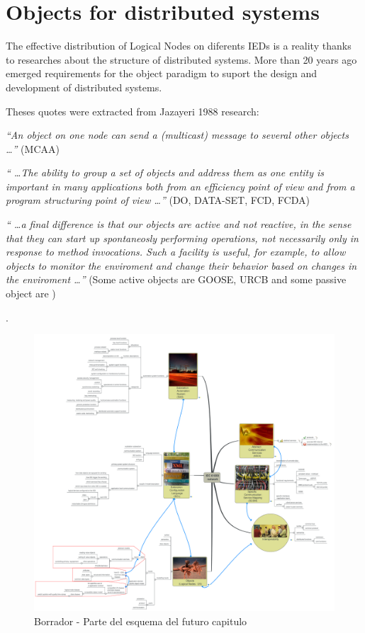 \section{Objects for distributed systems}

The effective distribution of Logical Nodes 
on diferents IEDs  
is a reality thanks to researches about 
the structure of distributed systems. More 
than 20 years ago emerged requirements 
for the object paradigm to suport the 
design and development of distributed systems.

Theses quotes were extracted from Jazayeri 
1988 research:

\emph{
``An object on one node can send a (multicast) message 
to several other objects \ldots''
} (MCAA) 

\emph{
`` \ldots The ability to group 
a set of objects and address them as one entity 
is important in many applications both from an 
efficiency point of view and from a program 
structuring point of view \ldots'' 
} (DO, DATA-SET, FCD, FCDA)

\emph{
`` \ldots a final 
difference is that our objects are active and 
not reactive, in the sense that they can start 
up spontaneosly performing operations, not 
necessarily only in response to method invocations.
Such a facility is useful, for example, to allow objects 
to monitor the enviroment and change their behavior based 
on changes in the enviroment \ldots'' 
} (Some active objects 
are GOOSE, URCB and some passive object 
are )

\cite{Jazayeri:1988}.



\begin{figure}
  \includegraphics[width=1.0\textwidth]{appendices/IEC61850network}
  \caption{Borrador - Parte del esquema del futuro capitulo }
  \label{fig:lan-networks-topologies-fig1}
\end{figure}


